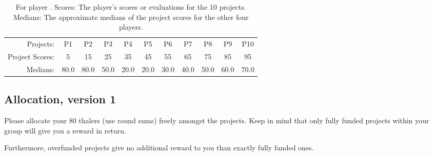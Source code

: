\documentclass[11pt, oneside]{article}   	%
\begin{document}

\begin{table}[h]
\centering
\begin{tabular}{r|cccccccccc}
Projects: & P1 & P2 & P3 & P4 & P5 & P6 & P7 & P8 & P9 & P10 \\
Project Scores: & 5 & 15 & 25 & 35 & 45 & 55 & 65 & 75 & 85 & 95 \\
Medians: &80.0 & 80.0 & 50.0 & 20.0 & 20.0 & 30.0 & 40.0 & 50.0 & 60.0 & 70.0 \\
\end{tabular}
\caption{For player \theplayer . Scores: The player's scores or evaluations for the 10 projects. Medians: The approximate medians of the project scores for the other four players.}
\label{fig:scores}
\end{table}


\subsection{Allocation, version 1}

Please allocate your 80 thalers (use round sums) freely amongst the projects. Keep in mind that only fully funded projects within your group will give you a reward in return.

Furthermore, overfunded projects give no additional reward to you than exactly fully funded ones.
\end{document}
